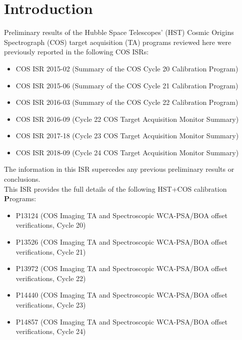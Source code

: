 \documentclass{stsci_report}
\begin{document}
\section{Introduction}\label{sec:Introduction}

Preliminary results of the Hubble Space Telescopes' (HST) Cosmic Origins Spectrograph (COS) target acquisition (TA) programs reviewed here were previously reported in the following COS ISRs:
\small
\begin{itemize}
\item{COS ISR 2015-02 (Summary of the COS Cycle 20 Calibration Program)}
\item{COS ISR 2015-06 (Summary of the COS Cycle 21 Calibration Program)}
\item{COS ISR 2016-03 (Summary of the COS Cycle 22 Calibration Program)}
\item{COS ISR 2016-09 (Cycle 22 COS Target Acquisition Monitor Summary)}
\item{COS ISR 2017-18 (Cycle 23 COS Target Acquisition Monitor Summary)}
\item{COS ISR 2018-09 (Cycle 24 COS Target Acquisition Monitor Summary)}
\end{itemize}
\normalsize
The information in this ISR supercedes any previous preliminary results or conclusions.\\

This ISR provides the full details of the following HST+COS calibration {\bf P}rograms:
\small
\begin{itemize}
\item{P13124 (COS Imaging TA and Spectroscopic WCA-PSA/BOA offset verifications, Cycle 20)}
\item{P13526 (COS Imaging TA and Spectroscopic WCA-PSA/BOA offset verifications, Cycle 21)}
\item{P13972 (COS Imaging TA and Spectroscopic WCA-PSA/BOA offset verifications, Cycle 22)}
\item{P14440 (COS Imaging TA and Spectroscopic WCA-PSA/BOA offset verifications, Cycle 23)}
\item{P14857 (COS Imaging TA and Spectroscopic WCA-PSA/BOA offset verifications, Cycle 24)}
\end{itemize}
\normalsize
\end{document}
